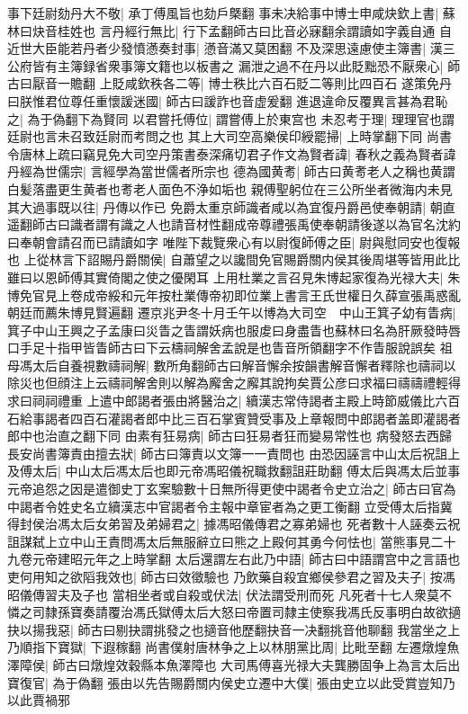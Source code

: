 事下廷尉劾丹大不敬|{
	承丁傅風旨也劾戶槩翻}
事未决給事中博士申咸炔欽上書|{
	蘇林曰炔音桂姓也}
言丹經行無比|{
	行下孟翻師古曰比音必寐翻余謂讀如字義自通}
自近世大臣能若丹者少發憤懣奏封事|{
	懣音滿又莫困翻}
不及深思遠慮使主簿書|{
	漢三公府皆有主簿録省衆事簿文籍也以板書之}
漏泄之過不在丹以此貶黜恐不厭衆心|{
	師古曰厭音一贍翻}
上貶咸欽秩各二等|{
	博士秩比六百石貶二等則比四百石}
遂策免丹曰朕惟君位尊任重懷諼迷國|{
	師古曰諼詐也音虚爰翻}
進退違命反覆異言甚為君恥之|{
	為于偽翻下為賢同}
以君嘗托傅位|{
	謂嘗傅上於東宫也}
未忍考于理|{
	理理官也謂廷尉也言未召致廷尉而考問之也}
其上大司空高樂侯印綬罷掃|{
	上時掌翻下同}
尚書令唐林上疏曰竊見免大司空丹策書泰深痛切君子作文為賢者諱|{
	春秋之義為賢者諱}
丹經為世儒宗|{
	言經學為當世儒者所宗也}
德為國黄耉|{
	師古曰黄耉老人之稱也黄謂白髪落盡更生黄者也耉老人面色不浄如垢也}
親傅聖躬位在三公所坐者微海内未見其大過事既以往|{
	丹傳以作已}
免爵太重京師識者咸以為宜復丹爵邑使奉朝請|{
	朝直遥翻師古曰識者謂有識之人也請音材性翻成帝尊禮張禹使奉朝請後遂以為官名沈約曰奉朝會請召而已請讀如字}
唯陛下裁覽衆心有以尉復師傅之臣|{
	尉與慰同安也復報也}
上從林言下詔賜丹爵關侯|{
	自蕭望之以讒間免官賜爵關内侯其後周堪等皆用此比雖曰以恩師傅其實倚閣之使之優閑耳}
上用杜業之言召見朱博起家復為光禄大夫|{
	朱博免官見上卷成帝綏和元年按杜業傳帝初即位業上書言王氏世權日久薛宣張禹惑亂朝廷而薦朱博見賢遍翻}
遷京兆尹冬十月壬午以博為大司空　中山王箕子幼有眚病|{
	箕子中山王興之子孟康曰災眚之眚謂妖病也服䖍曰身盡眚也蘇林曰名為肝厥發時唇口手足十指甲皆眚師古曰下云檮祠解舍孟說是也眚音所領翻字不作眚服說誤矣}
祖母馮太后自養視數禱祠解|{
	數所角翻師古曰解音懈余按韻書解音懈者釋除也禱祠以除災也但顔注上云禱祠解舍則以解為廨舍之廨其說拘矣賈公彦曰求福曰禱禱禮輕得求曰祠祠禮重}
上遣中郎謁者張由將醫治之|{
	續漢志常侍謁者主殿上時節威儀比六百石給事謁者四百石灌謁者郎中比三百石掌賓贊受事及上章報問中郎謁者盖即灌謁者郎中也治直之翻下同}
由素有狂易病|{
	師古曰狂易者狂而變易常性也}
病發怒去西歸長安尚書簿責由擅去狀|{
	師古曰簿責以文簿一一責問也}
由恐因誣言中山太后祝詛上及傅太后|{
	中山太后馮太后也即元帝馮昭儀祝職救翻詛莊助翻}
傅太后與馮太后並事元帝追怨之因是遣御史丁玄案驗數十日無所得更使中謁者令史立治之|{
	師古曰官為中謁者令姓史名立續漢志中官謁者令主報中章宦者為之更工衡翻}
立受傅太后指冀得封侯治馮太后女弟習及弟婦君之|{
	據馮昭儀傳君之寡弟婦也}
死者數十人誣奏云祝詛謀弑上立中山王責問馮太后無服辭立曰熊之上殿何其勇今何怯也|{
	當熊事見二十九卷元帝建昭元年之上時掌翻}
太后還謂左右此乃中語|{
	師古曰中語謂宫中之言語也}
吏何用知之欲䧟我效也|{
	師古曰效徵驗也}
乃飲藥自殺宜鄉侯參君之習及夫子|{
	按馮昭儀傳習夫及子也}
當相坐者或自殺或伏法|{
	伏法謂受刑而死}
凡死者十七人衆莫不憐之司隸孫寶奏請覆治馮氏獄傅太后大怒曰帝置司隸主使察我馮氏反事明白故欲擿抉以揚我惡|{
	師古曰剔抉謂挑發之也擿音他歷翻抉音一决翻挑音他聊翻}
我當坐之上乃順指下寶獄|{
	下遐稼翻}
尚書僕射唐林争之上以林朋黨比周|{
	比毗至翻}
左遷燉煌魚澤障侯|{
	師古曰燉煌效穀縣本魚澤障也}
大司馬傅喜光禄大夫龔勝固争上為言太后出寶復官|{
	為于偽翻}
張由以先告賜爵關内侯史立遷中大僕|{
	張由史立以此受賞豈知乃以此賈禍邪}



